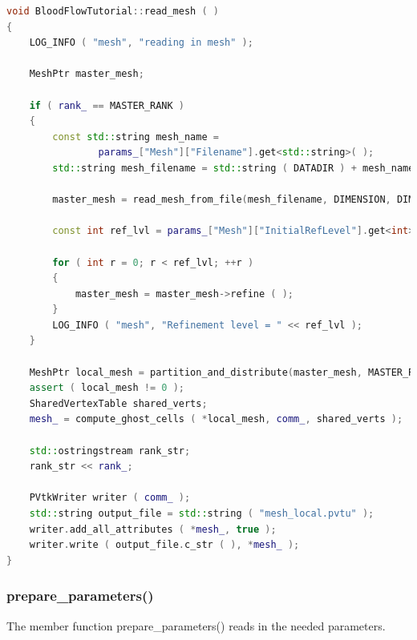 \documentclass[a4paper, 11pt, twoside]{article}
\begin{document}
\begin{lstlisting}[language=C++, basicstyle={\footnotesize, \ttfamily}, keywordstyle=\color{blue},  numbers=none, tabsize=4]
void BloodFlowTutorial::read_mesh ( )
{
    LOG_INFO ( "mesh", "reading in mesh" );

    MeshPtr master_mesh;

    if ( rank_ == MASTER_RANK )
    {
        const std::string mesh_name =
                params_["Mesh"]["Filename"].get<std::string>( );
        std::string mesh_filename = std::string ( DATADIR ) + mesh_name;

        master_mesh = read_mesh_from_file(mesh_filename, DIMENSION, DIMENSION, 0);

        const int ref_lvl = params_["Mesh"]["InitialRefLevel"].get<int>( );

        for ( int r = 0; r < ref_lvl; ++r )
        {
            master_mesh = master_mesh->refine ( );
        }
        LOG_INFO ( "mesh", "Refinement level = " << ref_lvl );
    }

    MeshPtr local_mesh = partition_and_distribute(master_mesh, MASTER_RANK, comm_);
    assert ( local_mesh != 0 );
    SharedVertexTable shared_verts;
    mesh_ = compute_ghost_cells ( *local_mesh, comm_, shared_verts );

    std::ostringstream rank_str;
    rank_str << rank_;

    PVtkWriter writer ( comm_ );
    std::string output_file = std::string ( "mesh_local.pvtu" );
    writer.add_all_attributes ( *mesh_, true );
    writer.write ( output_file.c_str ( ), *mesh_ );
}
\end{lstlisting}

\subsubsection{prepare\_parameters()}\label{sec:prepare_parameters}
The member function prepare\_parameters() reads in the needed parameters.
\end{document}
